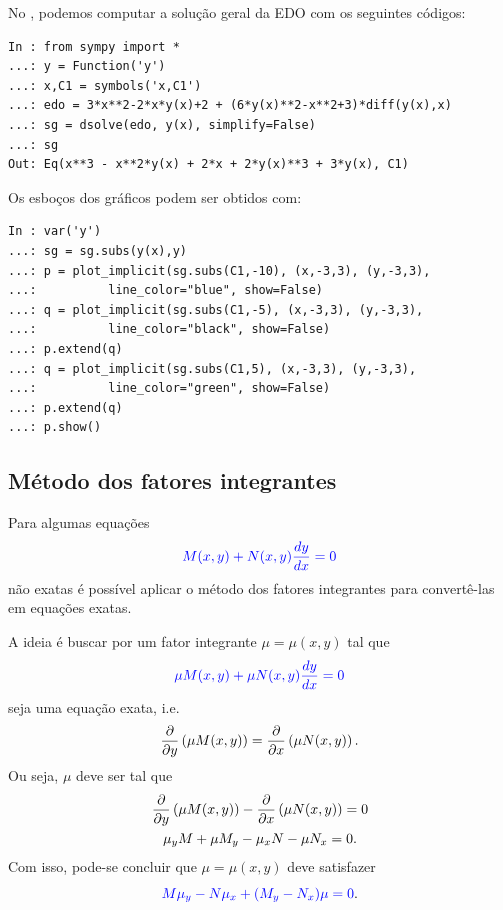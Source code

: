 \begin{ex}
  \ifispython
  No \python, podemos computar a solução geral da EDO com os seguintes códigos:
\begin{verbatim}
In : from sympy import *
...: y = Function('y')
...: x,C1 = symbols('x,C1')
...: edo = 3*x**2-2*x*y(x)+2 + (6*y(x)**2-x**2+3)*diff(y(x),x)
...: sg = dsolve(edo, y(x), simplify=False)
...: sg
Out: Eq(x**3 - x**2*y(x) + 2*x + 2*y(x)**3 + 3*y(x), C1)
\end{verbatim}
  Os esboços dos gráficos podem ser obtidos com:
\begin{verbatim}
In : var('y')
...: sg = sg.subs(y(x),y)
...: p = plot_implicit(sg.subs(C1,-10), (x,-3,3), (y,-3,3),
...:          line_color="blue", show=False)
...: q = plot_implicit(sg.subs(C1,-5), (x,-3,3), (y,-3,3),
...:          line_color="black", show=False)
...: p.extend(q)
...: q = plot_implicit(sg.subs(C1,5), (x,-3,3), (y,-3,3),
...:          line_color="green", show=False)
...: p.extend(q)
...: p.show()
\end{verbatim}
  \fi
\end{ex}

\subsection{Método dos fatores integrantes}

Para algumas equações
\begin{equation}\label{eq:eqnexata}
  {\color{blue}M(x,y) + N(x,y)\frac{dy}{dx} = 0}
\end{equation}
não exatas é possível aplicar o método dos fatores integrantes para convertê-las em equações exatas.

A ideia é buscar por um fator integrante $\mu = \mu(x,y)$ tal que
\begin{equation}
  {\color{blue}\mu M(x,y) + \mu N(x,y)\frac{dy}{dx} = 0}
\end{equation}
seja uma equação exata, i.e.
\begin{equation}
  \frac{\partial}{\partial y}\left(\mu M(x,y)\right) = \frac{\partial}{\partial x}\left(\mu N(x,y)\right).
\end{equation}
Ou seja, $\mu$ deve ser tal que
\begin{gather}
  \frac{\partial}{\partial y}\left(\mu M(x,y)\right) - \frac{\partial}{\partial x}\left(\mu N(x,y)\right) = 0 \\
  \mu_y M + \mu M_y - \mu_x N - \mu N_x = 0.
\end{gather}
Com isso, pode-se concluir que $\mu = \mu(x,y)$ deve satisfazer
\begin{equation}\label{eq:eqexata_fatorint}
  {\color{blue}M\mu_y - N\mu_x + (M_y - N_x)\mu = 0}.
\end{equation}

